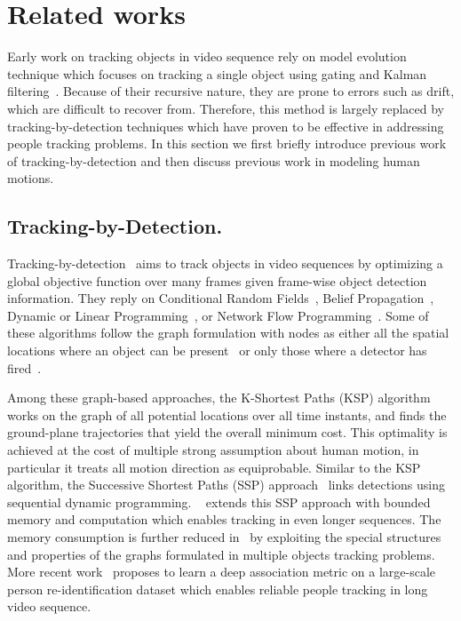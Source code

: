 \documentclass[10pt,twocolumn,letterpaper]{article}
\begin{document}
\fi

  
\section{Related works}\label{sec:related}
 
Early work on tracking objects in video sequence rely on model evolution technique which focuses on tracking a single object using gating and Kalman filtering~\cite{Mittal03a}. Because of their recursive nature, they are prone to errors such as drift, which are difficult to recover from. Therefore, this method is largely replaced by tracking-by-detection techniques which have proven to be effective in addressing people tracking problems. In this section we first briefly introduce previous work of tracking-by-detection and then discuss previous work in modeling human motions.


\subsection{Tracking-by-Detection.} 
Tracking-by-detection~\cite{Andriluka08} aims to track objects in video sequences by optimizing a global objective function over many frames given frame-wise object detection information. They reply on Conditional Random Fields~\cite{Lafferty01,Yang12a,Milan13}, Belief Propagation~\cite{Yedidia00,Choi12}, Dynamic or Linear Programming~\cite{Bellman57,Segal13}, or Network Flow Programming~\cite{Ahuja93,Dehghan15}.  Some of these algorithms follow the graph formulation with nodes as either all the spatial locations where an object can be present~\cite{Fleuret08a,Berclaz11,BenShitrit14} or only those where a detector has fired~\cite{Jiang07,Tang15,Shu12,Benfold11}.

Among these graph-based approaches, the K-Shortest Paths (KSP) algorithm~\cite{Berclaz11} works on the graph of all potential locations over all time instants, and finds the ground-plane trajectories that yield the overall minimum cost. This optimality is achieved at the cost of multiple strong assumption about human motion, in particular it treats all motion direction as equiprobable. Similar to the KSP algorithm, the Successive Shortest Paths (SSP) approach~\cite{Pirsiavash11} links detections using sequential dynamic programming. ~\cite{Lenz15b} extends this SSP approach with bounded memory and computation which enables tracking in even longer sequences. The memory consumption is further reduced in~\cite{Wang19f} by exploiting the special structures and properties of the graphs formulated in multiple objects tracking problems. More recent work~\cite{Wojke17} proposes to learn a deep association metric on a large-scale person re-identification dataset which enables reliable people tracking in long video sequence. 
\end{document}
